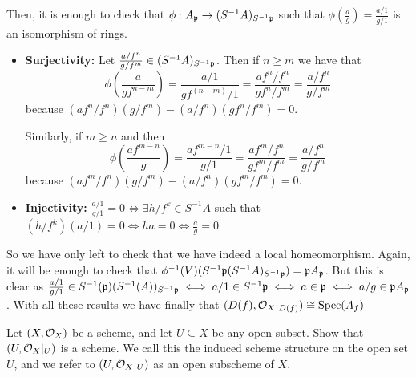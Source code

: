 \begin{sol}
	Then, it is enough to check that $\phi: A_{\mathfrak{p}} \to (S^{-1}A)_{S^{-1}\mathfrak{p}}$ such that $\phi(\frac{a}{g}) = \frac{a/1}{g/1}$ is an isomorphism of rings.
	\begin{itemize}
		\item \textbf{Surjectivity:} Let $\frac{a/f^n}{g/f^m} \in (S^{-1}A)_{S^{-1}\mathfrak{p}}$. Then if $n \geq m$ we have that 
		\[
			\phi \left (\frac{a}{gf^{n-m}} \right ) = \frac{a/1}{gf^(n-m)/1} = \frac{af^n/f^n}{gf^n/f^m} = \frac{a/f^n}{g/f^m} 
		\]
		because $(af^n/f^n) (g/f^m) - (a/f^n) (gf^n/f^m) = 0$.

		Similarly, if $m \geq n$ and then 
		\[
			\phi \left (\frac{a f^{m-n}}{g} \right ) = \frac{af^{m-n}/1}{g/1} = \frac{af^m/f^n}{gf^m/f^m} = \frac{a/f^n}{g/f^m} 
		\]
		because $(af^m/f^n) (g/f^m) - (a/f^n) (gf^m/f^m) = 0$.

		\item \textbf{Injectivity:} $\frac{a/1}{g/1} = 0 \iff \exists h/f^k \in S^{-1}A$ such that $(h/f^k)(a/1) = 0 \iff ha = 0 \iff \frac{a}{g} = 0$ 
	\end{itemize}

	So we have only left to check that we have indeed a local homeomorphism. Again, it will be enough to check that $\phi^{-1}(V)(S^{-1}\mathfrak{p} (S^{-1}A)_{S^{-1}\mathfrak{p}}) = \mathfrak{p} A_{\mathfrak{p}}$. But this is clear as $\frac{a/1}{g/1} \in S^{-1}(\mathfrak{p})(S^{-1}(A))_{S^{-1}\mathfrak{p}} \iff a/1 \in S^{-1}\mathfrak{p} \iff a \in \mathfrak{p} \iff a/g \in \mathfrak{p} A_{\mathfrak{p}}$. With all these results we have finally that $(D(f), \mathcal{O}_X|_{D(f)}) \cong \mathrm{Spec}(A_f)$
\end{sol}

\begin{ex}
	Let $(X, \mathcal{O}_X)$ be a scheme, and let $U \subseteq X$ be any open subset. Show that $(U, \mathcal{O}_X|_U)$ is a scheme. We call this the induced scheme structure on the open set $U$, and we refer to $(U, \mathcal{O}_X|_U)$ as an open subscheme of $X$.
\end{ex}

